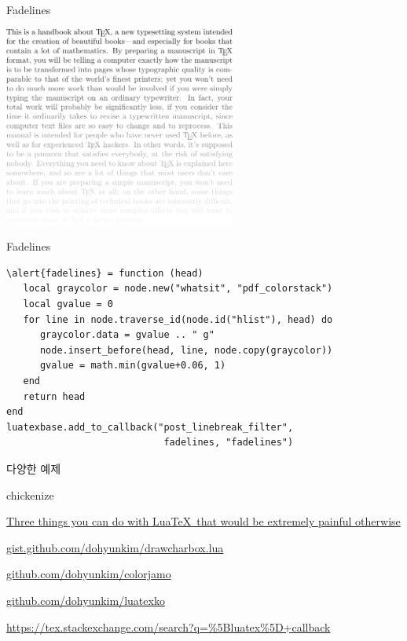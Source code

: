 \documentclass[t,10pt]{beamer}
\begin{document}
\begin{frame}{Fadelines}
  \begin{center}
    \includegraphics[width=3in]{fade.pdf}
  \end{center}
\end{frame}

\begin{frame}[fragile]{Fadelines}
  \begin{Verbatim}[fontsize=\small,commandchars=\\\{\}]
\alert{fadelines} = function (head)
   local graycolor = node.new("whatsit", "pdf_colorstack")
   local gvalue = 0
   for line in node.traverse_id(node.id("hlist"), head) do
      graycolor.data = gvalue .. " g"
      node.insert_before(head, line, node.copy(graycolor))
      gvalue = math.min(gvalue+0.06, 1)
   end
   return head
end
luatexbase.add_to_callback("post_linebreak_filter",
                            fadelines, "fadelines")
  \end{Verbatim}
\end{frame}

\let\tempone\itemize
\let\temptwo\enditemize
\renewenvironment{itemize}{\tempone\addtolength{\itemsep}{0.5\baselineskip}}
                 {\temptwo}
\begin{frame}[fragile]{다양한 예제}
  \begin{itemize}
  \item {\rainbowcolor{}
    chickenize\par\unrainbowcolor}
  \item \href{https://www.tug.org/TUGboat/tb31-3/tb99isambert.pdf}%
    {\alert{Three things you can do with Lua\TeX\ that would be extremely %
        painful otherwise}}
  \item \href{https://gist.github.com/dohyunkim/cde58679facb606a01a9\#file-drawcharbox-lua-L56-L77}%
    {gist.github.com/dohyunkim/drawcharbox.lua}
  \item \href{https://github.com/dohyunkim/colorjamo/blob/master/colorjamo.lua\#L110-L138}%
    {github.com/dohyunkim/colorjamo}
  \item \href{https://github.com/dohyunkim/luatexko}%
    {github.com/dohyunkim/luatexko}
  \item \href{https://tex.stackexchange.com/search?q=\%5Bluatex\%5D+callback}%
    {https://tex.stackexchange.com/search?q=\%5Bluatex\%5D+callback}
  \end{itemize}
\end{frame}
\end{document}
